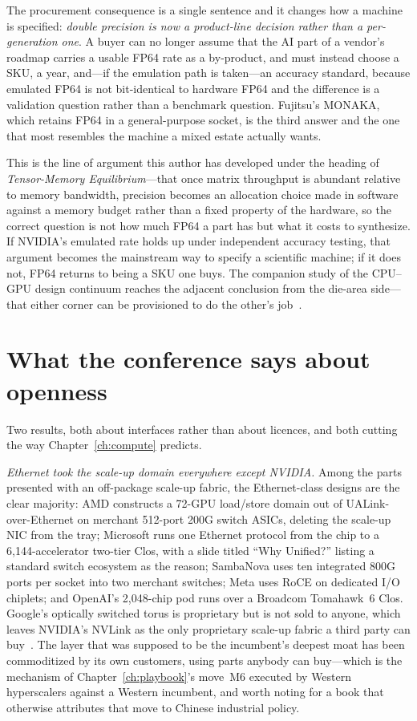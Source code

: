 The procurement consequence is a single sentence and it changes how a machine is specified: \emph{double precision is now a product-line decision rather than a per-generation one}. A buyer can no longer assume that the AI part of a vendor's roadmap carries a usable FP64 rate as a by-product, and must instead choose a SKU, a year, and---if the emulation path is taken---an accuracy standard, because emulated FP64 is not bit-identical to hardware FP64 and the difference is a validation question rather than a benchmark question. Fujitsu's MONAKA, which retains FP64 in a general-purpose socket, is the third answer and the one that most resembles the machine a mixed estate actually wants.

This is the line of argument this author has developed under the heading of \emph{Tensor-Memory Equilibrium}---that once matrix throughput is abundant relative to memory bandwidth, precision becomes an allocation choice made in software against a memory budget rather than a fixed property of the hardware, so the correct question is not how much FP64 a part has but what it costs to synthesize. If NVIDIA's emulated rate holds up under independent accuracy testing, that argument becomes the mainstream way to specify a scientific machine; if it does not, FP64 returns to being a SKU one buys. The companion study of the CPU--GPU design continuum reaches the adjacent conclusion from the die-area side---that either corner can be provisioned to do the other's job~\cite{dhm-cacm,dhm-long}.

\section{What the conference says about openness}

Two results, both about interfaces rather than about licences, and both cutting the way Chapter~\ref{ch:compute} predicts.

\emph{Ethernet took the scale-up domain everywhere except NVIDIA.} Among the parts presented with an off-package scale-up fabric, the Ethernet-class designs are the clear majority: AMD constructs a 72-GPU load/store domain out of UALink-over-Ethernet on merchant 512-port 200G switch ASICs, deleting the scale-up NIC from the tray; Microsoft runs one Ethernet protocol from the chip to a 6{,}144-accelerator two-tier Clos, with a slide titled ``Why Unified?'' listing a standard switch ecosystem as the reason; SambaNova uses ten integrated 800G ports per socket into two merchant switches; Meta uses RoCE on dedicated I/O chiplets; and OpenAI's 2{,}048-chip pod runs over a Broadcom Tomahawk~6 Clos. Google's optically switched torus is proprietary but is not sold to anyone, which leaves NVIDIA's NVLink as the only proprietary scale-up fabric a third party can buy~\cite{hc2026-scaleup,hc2026-jalapeno,hc2026-tpu8}. The layer that was supposed to be the incumbent's deepest moat has been commoditized by its own customers, using parts anybody can buy---which is the mechanism of Chapter~\ref{ch:playbook}'s move~M6 executed by Western hyperscalers against a Western incumbent, and worth noting for a book that otherwise attributes that move to Chinese industrial policy.

